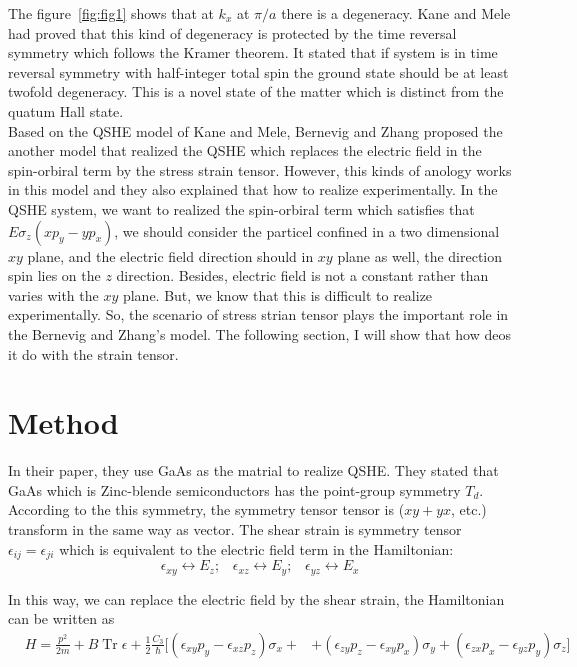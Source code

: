 \documentclass[12pt,a4paper]{article}
\begin{document}
The figure~\ref{fig:fig1} shows that at $k_x$ at $\pi/a$ there is a
degeneracy. 
Kane and Mele had proved that this kind of degeneracy is protected by the time
reversal symmetry which follows the Kramer theorem. It stated that if
system is in time reversal symmetry with half-integer total spin the 
ground state should be at least twofold degeneracy. This is a novel state
of the matter which is distinct from the quatum Hall state.\\ 

Based on the QSHE model of Kane and Mele, Bernevig and Zhang proposed the
another model that realized the QSHE which replaces the electric field in
the spin-orbiral term by the stress strain tensor. However, this kinds of
anology works in this model and they also explained that how to realize
experimentally. In the QSHE system, we want to realized the spin-orbiral 
term which satisfies that $E \sigma_z (xp_y-yp_x)$, we should consider the
particel confined in a two dimensional $xy$ plane, and the electric field
direction should in $xy$ plane as well, the direction spin lies on the $z$
direction. Besides, electric field is not a constant rather than varies
with the $xy$ plane. But, we know that this is difficult to realize
experimentally. So, the scenario of stress strian tensor plays the
important role in the Bernevig and Zhang's model. The following section, I
will show that how deos it do with the strain tensor.

\section*{Method}
In their paper, they use GaAs as the matrial to realize QSHE\@. They stated
that GaAs which is Zinc-blende semiconductors has the point-group symmetry 
$T_d$. According to the this symmetry, the symmetry tensor tensor is
($xy + yx$, etc.) transform in the same way as vector. The shear strain is
symmetry tensor $\epsilon_{ij} = \epsilon_{ji}$ which is equivalent to the 
electric field term in the Hamiltonian:
\begin{equation*} \label{strainelectricfieldanalogy}
\epsilon_{xy} \leftrightarrow E_z;\;\;\; \epsilon_{xz} \leftrightarrow
E_y;\;\;\;\epsilon_{yz} \leftrightarrow E_x
\end{equation*}

\noindent
In this way, we can replace the electric field by the shear strain, the
Hamiltonian can be written as 
\begin{eqnarray*}
& H = \frac{p^2}{2m} + B \operatorname{Tr}{\epsilon} +\frac{1}{2}
\frac{C_3}{\hbar}
[ (\epsilon_{xy} p_y - \epsilon_{xz} p_z) \sigma_x + \nonumber 
& +(\epsilon_{zy} p_z - \epsilon_{xy} p_x) \sigma_y + (\epsilon_{zx}
p_x - \epsilon_{yz} p_y) \sigma_z ]
\end{eqnarray*}
\end{document}

